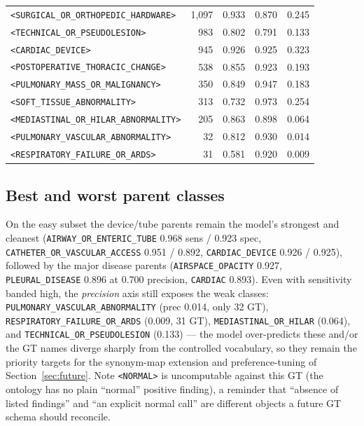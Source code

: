\documentclass[11pt,a4paper]{article}
\begin{document}
\begin{longtable}{p{6.4cm} r r r r}
\texttt{<SURGICAL\_OR\_ORTHOPEDIC\_HARDWARE>} & 1{,}097 & 0.933 & 0.870 & 0.245 \\
\texttt{<TECHNICAL\_OR\_PSEUDOLESION>} & 983 & 0.802 & 0.791 & 0.133 \\
\texttt{<CARDIAC\_DEVICE>} & 945 & 0.926 & 0.925 & 0.323 \\
\texttt{<POSTOPERATIVE\_THORACIC\_CHANGE>} & 538 & 0.855 & 0.923 & 0.193 \\
\texttt{<PULMONARY\_MASS\_OR\_MALIGNANCY>} & 350 & 0.849 & 0.947 & 0.183 \\
\texttt{<SOFT\_TISSUE\_ABNORMALITY>} & 313 & 0.732 & 0.973 & 0.254 \\
\texttt{<MEDIASTINAL\_OR\_HILAR\_ABNORMALITY>} & 205 & 0.863 & 0.898 & 0.064 \\
\texttt{<PULMONARY\_VASCULAR\_ABNORMALITY>} & 32 & 0.812 & 0.930 & 0.014 \\
\texttt{<RESPIRATORY\_FAILURE\_OR\_ARDS>} & 31 & 0.581 & 0.920 & 0.009 \\
\end{longtable}

\subsection{Best and worst parent classes}
On the easy subset the device/tube parents remain the model's strongest and cleanest (\texttt{AIRWAY\_OR\_ENTERIC\_TUBE} 0.968 sens / 0.923 spec, \texttt{CATHETER\_OR\_VASCULAR\_ACCESS} 0.951 / 0.892, \texttt{CARDIAC\_DEVICE} 0.926 / 0.925), followed by the major disease parents (\texttt{AIRSPACE\_OPACITY} 0.927, \texttt{PLEURAL\_DISEASE} 0.896 at 0.700 precision, \texttt{CARDIAC} 0.893). Even with sensitivity banded high, the \emph{precision} axis still exposes the weak classes: \texttt{PULMONARY\_VASCULAR\_ABNORMALITY} (prec 0.014, only 32 GT), \texttt{RESPIRATORY\_FAILURE\_OR\_ARDS} (0.009, 31 GT), \texttt{MEDIASTINAL\_OR\_HILAR} (0.064), and \texttt{TECHNICAL\_OR\_PSEUDOLESION} (0.133) --- the model over-predicts these and/or the GT names diverge sharply from the controlled vocabulary, so they remain the priority targets for the synonym-map extension and preference-tuning of Section~\ref{sec:future}. Note \texttt{<NORMAL>} is uncomputable against this GT (the ontology has no plain ``normal'' positive finding), a reminder that ``absence of listed findings'' and ``an explicit normal call'' are different objects a future GT schema should reconcile.

\end{document}
